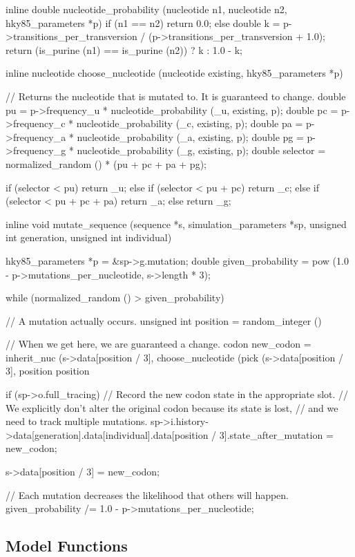 \documentclass{article}
\begin{document}
\begin{ccode}
inline double nucleotide_probability (nucleotide n1, nucleotide n2, hky85_parameters *p) {
  if (n1 == n2)
    return 0.0;
  else {
    double k = p->transitions_per_transversion /
	       (p->transitions_per_transversion + 1.0);
    return (is_purine (n1) == is_purine (n2)) ? k : 1.0 - k;
  }
}

inline nucleotide choose_nucleotide (nucleotide existing, hky85_parameters *p) {
  // Returns the nucleotide that is mutated to. It is guaranteed to change.
  double pu        = p->frequency_u * nucleotide_probability (_u, existing, p);
  double pc        = p->frequency_c * nucleotide_probability (_c, existing, p);
  double pa        = p->frequency_a * nucleotide_probability (_a, existing, p);
  double pg        = p->frequency_g * nucleotide_probability (_g, existing, p);
  double selector  = normalized_random () * (pu + pc + pa + pg);

  if (selector < pu)        	 	return _u;
  else if (selector < pu + pc)		return _c;
  else if (selector < pu + pc + pa)	return _a;
  else					return _g;
}

inline void mutate_sequence (sequence *s, simulation_parameters *sp,
			     unsigned int generation, unsigned int individual) {
  hky85_parameters *p = &sp->g.mutation;
  double given_probability = pow (1.0 - p->mutations_per_nucleotide, s->length * 3);

  while (normalized_random () > given_probability) {
    // A mutation actually occurs.
    unsigned int position = random_integer () %

    // When we get here, we are guaranteed a change.
    codon new_codon =
      inherit_nuc (s->data[position / 3],
		   choose_nucleotide (pick (s->data[position / 3], position %
		   position %

    if (sp->o.full_tracing)
      // Record the new codon state in the appropriate slot.
      // We explicitly don't alter the original codon because its state is lost,
      // and we need to track multiple mutations.
      sp->i.history->data[generation].data[individual].data[position / 3].state_after_mutation = new_codon;

    s->data[position / 3] = new_codon;
    
    // Each mutation decreases the likelihood that others will happen.
    given_probability /= 1.0 - p->mutations_per_nucleotide;
  }
}
\end{ccode}

    \subsection{Model Functions}
\end{document}
